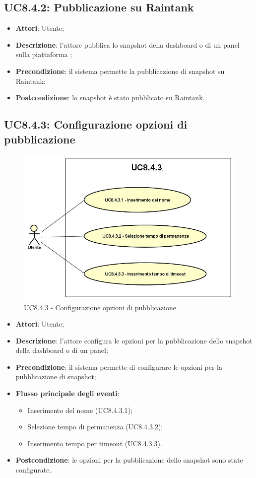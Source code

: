 \subsection{UC8.4.2: Pubblicazione su Raintank}
\hypertarget{UC8.4.2}{}
\begin{itemize}
	\item \textbf{Attori}: Utente;
	\item \textbf{Descrizione}: l'attore pubblica lo snapshot della dashboard o di un panel sulla piattaforma ;
	\item \textbf{Precondizione}: il sistema permette la pubblicazione di snapshot su Raintank;
	\item \textbf{Postcondizione}: lo snapshot è stato pubblicato su Raintank.
\end{itemize}

\subsection{UC8.4.3: Configurazione opzioni di pubblicazione}
\hypertarget{UC8.4.3}{}
\begin{figure} [H]
	\centering
	\includegraphics[scale=0.45]{Img/UC8-4-3}
	\caption{UC8.4.3 - Configurazione opzioni di pubblicazione}\label{}
\end{figure}
\begin{itemize}
	\item \textbf{Attori}: Utente;
	\item \textbf{Descrizione}: l'attore configura le opzioni per la pubblicazione dello snapshot della dashboard o di un panel;
	\item \textbf{Precondizione}: il sistema permette di configurare le opzioni per la pubblicazione di snapshot;
	\item \textbf{Flusso principale degli eventi}:
	\begin{itemize}
		\item Inserimento del nome (UC8.4.3.1);
		\item Selezione tempo di permanenza (UC8.4.3.2);
		\item Inserimento tempo per timeout (UC8.4.3.3).
	\end{itemize}
	\item \textbf{Postcondizione}: le opzioni per la pubblicazione dello snapshot sono state configurate.
\end{itemize}

